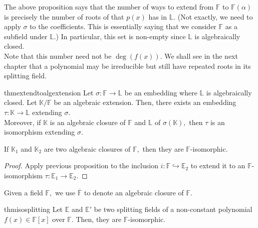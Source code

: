 \begin{rem}
    The above proposition says that the number of ways to extend from $\mathbb{F}$ to $\mathbb{F}(\alpha)$ is precisely the number of roots of that $p(x)$ has in $\mathbb{L}.$ (Not exactly, we need to apply $\sigma$ to the coefficients. This is essentially saying that we consider $\mathbb{F}$ as a subfield under $\mathbb{L}.$) In particular, this set is non-empty since $\mathbb{L}$ is algebraically closed. \\
    Note that this number need not be $\deg(f(x)).$ We shall see in the next chapter that a polynomial may be irreducible but still have repeated roots in its splitting field.
\end{rem}

\begin{restatable}[]{thm}{extendtoalgextension}
\label{thm:extendtoalgextension}
    Let $\sigma : \mathbb{F} \to \mathbb{L}$ be an embedding where $\mathbb{L}$ is algebraically closed. Let $\mathbb{K}/\mathbb{F}$ be an algebraic extension. Then, there exists an embedding $\tau : \mathbb{K} \to \mathbb{L}$ extending $\sigma.$ \\
    Moreover, if $\mathbb{K}$ is an algebraic closure of $\mathbb{F}$ and $\mathbb{L}$ of $\sigma(\mathbb{K}),$ then $\tau$ is an isomorphism extending $\sigma.$ \hfill\hyperref[thm:extendtoalgextension2]{\downsym}
\end{restatable}

\begin{cor}
    If $\mathbb{K}_1$ and $\mathbb{K}_2$ are two algebraic closures of $\mathbb{F},$ then they are $\mathbb{F}$-isomorphic.
\end{cor}
\begin{proof} 
    Apply previous proposition to the inclusion $i : \mathbb{F} \hookrightarrow \mathbb{E}_2$ to extend it to an $\mathbb{F}$-isomorphism $\tau : \mathbb{E}_1 \to \mathbb{E}_2.$
\end{proof}

\begin{defn}%
    Given a field $\mathbb{F},$ we use $\overline{\mathbb{F}}$ to denote an algebraic closure of $\mathbb{F}.$ 
\end{defn}

\begin{restatable}{thm}{isosplitting}
\label{thm:isosplitting}
    Let $\mathbb{E}$ and $\mathbb{E}'$ be two splitting fields of a non-constant polynomial $f(x) \in \mathbb{F}[x]$ over $\mathbb{F}.$ Then, they are $\mathbb{F}$-isomorphic. \hfill\hyperref[thm:isosplitting2]{\downsym}
\end{restatable}